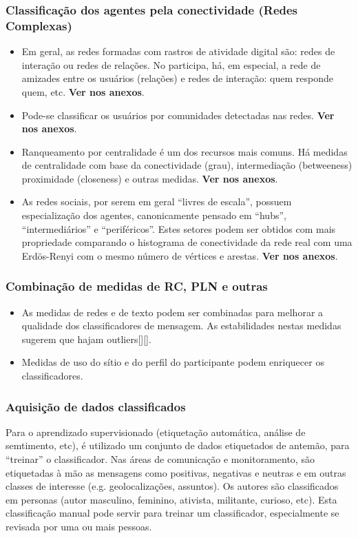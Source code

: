 \documentclass[12pt]{article}
\begin{document}
\subsubsection{Classificação dos agentes pela conectividade (Redes Complexas)}
\begin{itemize}
    \item Em geral, as redes formadas com rastros de atividade digital são: redes de interação ou redes de relações. No participa, há, em especial, a rede de amizades entre os usuários (relações) e redes de interação: quem responde quem, etc. {\bf Ver nos anexos}.
    \item Pode-se classificar os usuários por comunidades detectadas nas redes. {\bf Ver nos anexos}.
    \item Ranqueamento por centralidade é um dos recursos mais comuns. Há medidas de centralidade com base da conectividade (grau), intermediação (betweeness) proximidade (closeness) e outras medidas. {\bf Ver nos anexos}.
    \item As redes sociais, por serem em geral “livres de escala”, possuem especialização dos agentes, canonicamente pensado em “hubs”, “intermediários” e “periféricos”. Estes setores podem ser obtidos com mais propriedade comparando o histograma de conectividade da rede real com uma Erdös-Renyi com o mesmo número de vértices e arestas. {\bf Ver nos anexos}.
\end{itemize}
\subsubsection{Combinação de medidas de RC, PLN e outras}
\begin{itemize}
    \item As medidas de redes e de texto podem ser combinadas para melhorar a qualidade dos classificadores de mensagem. As estabilidades nestas medidas sugerem que hajam outliers[][].
    \item Medidas de uso do sítio e do perfil do participante podem enriquecer os classificadores.
\end{itemize}
\subsubsection{Aquisição de dados classificados}
Para o aprendizado supervisionado (etiquetação automática, análise de semtimento, etc), é utilizado um conjunto de dados etiquetados de antemão, para “treinar” o classificador.
Nas áreas de comunicação e monitoramento, são etiquetadas à mão as mensagens como positivas, negativas e neutras e em outras classes de interesse (e.g. geolocalizações, assuntos). Os autores são classificados em personas (autor masculino, feminino, ativista, militante, curioso, etc). Esta classificação manual pode servir para treinar um classificador, especialmente se revisada por uma ou mais pessoas.
\end{document}
